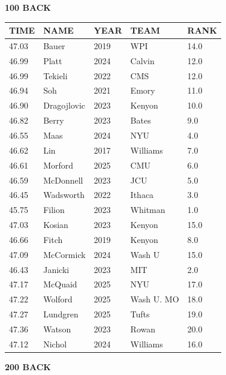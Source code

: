 \begin{table}[H]
\centering
\begin{minipage}[t]{0.48\textwidth}
\centering
\textbf{100 BACK}\\[0.1cm]
\begin{tabular}{@{}p{1.8cm}p{2.8cm}p{1.2cm}p{1.4cm}p{0.8cm}@{}}
\hline
    \textbf{TIME} & \textbf{NAME} & \textbf{YEAR} & \textbf{TEAM} & \textbf{RANK} \\
\hline
    47.03 & Bauer & 2019 & WPI & 14.0 \\
    46.99 & Platt & 2024 & Calvin & 12.0 \\
    46.99 & Tekieli & 2022 & CMS & 12.0 \\
    46.94 & Soh & 2021 & Emory & 11.0 \\
    46.90 & Dragojlovic & 2023 & Kenyon & 10.0 \\
    46.82 & Berry & 2023 & Bates & 9.0 \\
    46.55 & Maas & 2024 & NYU & 4.0 \\
    46.62 & Lin & 2017 & Williams & 7.0 \\
    46.61 & Morford & 2025 & CMU & 6.0 \\
    46.59 & McDonnell & 2023 & JCU & 5.0 \\
    46.45 & Wadsworth & 2022 & Ithaca & 3.0 \\
    45.75 & Filion & 2023 & Whitman & 1.0 \\
    47.03 & Kosian & 2023 & Kenyon & 15.0 \\
    46.66 & Fitch & 2019 & Kenyon & 8.0 \\
    47.09 & McCormick & 2024 & Wash U & 15.0 \\
    46.43 & Janicki & 2023 & MIT & 2.0 \\
    47.17 & McQuaid & 2025 & NYU & 17.0 \\
    47.22 & Wolford & 2025 & Wash U. MO & 18.0 \\
    47.27 & Lundgren & 2025 & Tufts & 19.0 \\
    47.36 & Watson & 2023 & Rowan & 20.0 \\
    47.12 & Nichol & 2024 & Williams & 16.0 \\
\hline
\end{tabular}
\end{minipage}\hfill
\begin{minipage}[t]{0.48\textwidth}
\centering
\textbf{200 BACK}\\[0.1cm]
\begin{tabular}{@{}p{1.8cm}p{2.8cm}p{1.2cm}p{1.4cm}p{0.8cm}@{}}

\end{tabular}
\end{minipage}
\end{table}
